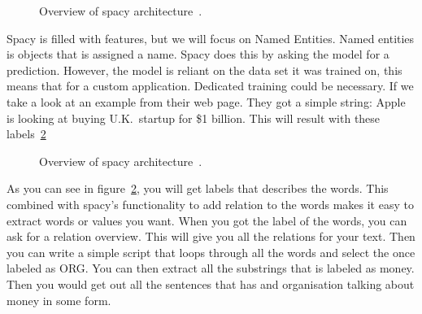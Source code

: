 \begin{figure}[h]
    \caption{Overview of spacy architecture~\cite{spaCy101}.}
    \label{fig:architecture}
\end{figure}

Spacy is filled with features, but we will focus on Named Entities.
Named entities is objects that is assigned a name.
Spacy does this by asking the model for a prediction.
However, the model is reliant on the data set it was trained on, this means that for a custom application.
Dedicated training could be necessary.
If we take a look at an example from their web page.
They got a simple string: Apple is looking at buying U.K.\ startup for \$1 billion.
This will result with these labels~\ref{fig:Spacy labels}

\begin{figure}[h]
    \caption{Overview of spacy architecture~\cite{spaCy101}.}
    \label{fig:Spacy labels}
\end{figure}

As you can see in figure~\ref{fig:Spacy labels}, you will get labels that describes the words.
This combined with spacy's functionality to add relation to the words makes it easy to extract words or values you want.
When you got the label of the words, you can ask for a relation overview.
This will give you all the relations for your text.
Then you can write a simple script that loops through all the words and select the once labeled as ORG. You can then
extract all the substrings that is labeled as money.
Then you would get out all the sentences that has and organisation talking about money in some form. 







